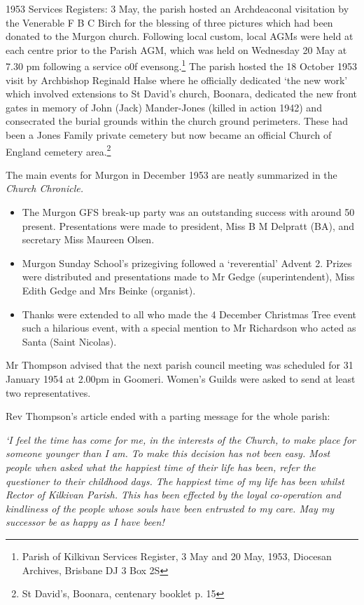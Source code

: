 1953 Services Registers: 3 May, the parish hosted an Archdeaconal visitation by the Venerable F B C Birch for the blessing of three pictures which had been donated to the Murgon church. Following local custom, local AGMs were held at each centre prior to the Parish AGM, which was held on Wednesday 20 May at 7.30 pm following a service o0f evensong.\footnote{Parish of Kilkivan Services Register, 3 May and 20 May, 1953, Diocesan Archives, Brisbane DJ 3 Box 2S} The parish hosted the 18 October 1953 visit by Archbishop Reginald Halse where he officially dedicated `the new work' which involved extensions to St David's church, Boonara, dedicated the new front gates in memory of John (Jack) Mander-Jones (killed in action 1942) and consecrated the burial grounds within the church ground perimeters. These had been a Jones Family private cemetery but now became an official Church of England cemetery area.\footnote{St David's, Boonara, centenary booklet p. 15}

The main events for Murgon in December 1953 are neatly summarized in the \emph{Church Chronicle.}

\begin{itemize}
\item
  The Murgon GFS break-up party was an outstanding success with around 50 present. Presentations were made to president, Miss B M Delpratt (BA), and secretary Miss Maureen Olsen.
\item
  Murgon Sunday School's prizegiving followed a `reverential' Advent 2. Prizes were distributed and presentations made to Mr Gedge (superintendent), Miss Edith Gedge and Mrs Beinke (organist).
\item
  Thanks were extended to all who made the 4 December Christmas Tree event such a hilarious event, with a special mention to Mr Richardson who acted as Santa (Saint Nicolas).
\end{itemize}

Mr Thompson advised that the next parish council meeting was scheduled for 31 January 1954 at 2.00pm in Goomeri. Women's Guilds were asked to send at least two representatives.

Rev Thompson's article ended with a parting message for the whole parish:

\emph{`I feel the time has come for me, in the interests of the Church, to make place for someone younger than I am. To make this decision has not been easy. Most people when asked what the happiest time of their life has been, refer the questioner to their childhood days. The happiest time of my life has been whilst Rector of Kilkivan Parish. This has been effected by the loyal co-operation and kindliness of the people whose souls have been entrusted to my care. May my successor be as happy as I have been!}

